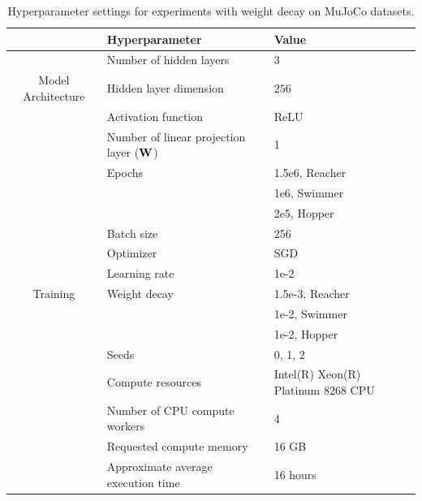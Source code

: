 \begin{table}[h!]
\caption{Hyperparameter settings for experiments with weight decay on MuJoCo datasets.}
\label{table:mujoco_mlp}
\vskip 0.15in
\begin{center}
\begin{small}
\begin{tabular}{cll}
\toprule
    & \textbf{Hyperparameter} & \textbf{Value}  \\
\midrule
    & Number of hidden layers   & $3$ \\
  Model Architecture  & Hidden layer dimension & $256$  \\ 
    & Activation function & ReLU  \\ 
    & Number of linear projection layer (${\mathbf W}$) & 1 \\
\midrule
    & Epochs & 1.5e6, Reacher \\
    &   & 1e6, Swimmer \\
    &   & 2e5, Hopper\\
    & Batch size & 256 \\
    & Optimizer & SGD \\
    & Learning rate & 1e-2 \\
Training    & Weight decay & 1.5e-3, Reacher \\
    &   & 1e-2, Swimmer \\
    &   & 1e-2, Hopper \\
    & Seeds & 0, 1, 2 \\
    & Compute resources & Intel(R) Xeon(R) Platinum 8268 CPU \\
    & Number of CPU compute workers & 4 \\
    & Requested compute memory & 16 GB \\
    & Approximate average execution time & 16 hours\\
    
\bottomrule
\end{tabular}
\end{small}
\end{center}
\end{table} 

